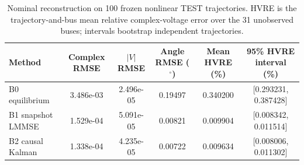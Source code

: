 \begin{table}[t]
\caption{Nominal reconstruction on 100 frozen nonlinear TEST trajectories. HVRE is the trajectory-and-bus mean relative complex-voltage error over the 31 unobserved buses; intervals bootstrap independent trajectories.}
\label{tab:nominal-results}
\centering
\footnotesize
\begin{tabular}{lccccc}
\toprule
Method & Complex RMSE & $|V|$ RMSE & Angle RMSE ($^\circ$) & Mean HVRE (\%) & 95\% HVRE interval (\%) \\
\midrule
B0 equilibrium & 3.486e-03 & 2.496e-05 & 0.19497 & 0.340200 & [0.293231, 0.387428] \\
B1 snapshot LMMSE & 1.529e-04 & 5.091e-05 & 0.00821 & 0.009904 & [0.008342, 0.011514] \\
B2 causal Kalman & 1.338e-04 & 4.235e-05 & 0.00722 & 0.009634 & [0.008006, 0.011302] \\
\bottomrule
\end{tabular}
\end{table}
